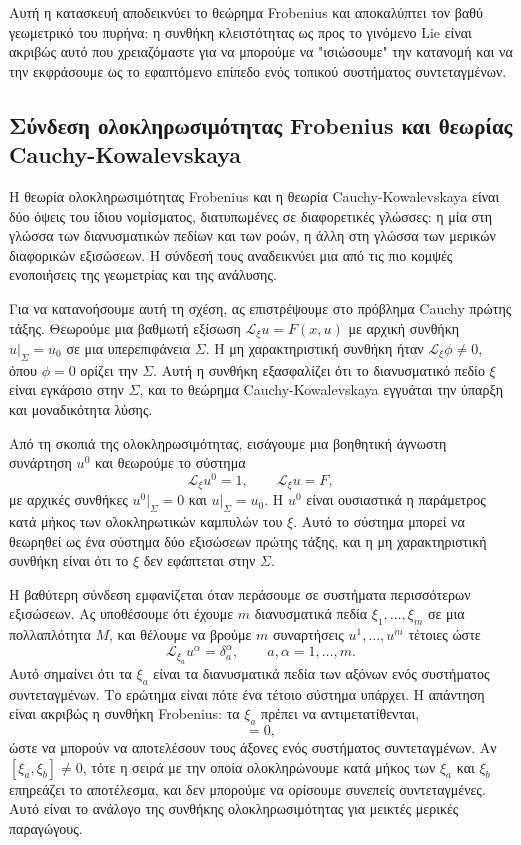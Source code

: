 \documentclass[12pt]{article}
\begin{document}
Αυτή η κατασκευή αποδεικνύει το θεώρημα Frobenius και αποκαλύπτει τον βαθύ γεωμετρικό του πυρήνα: η συνθήκη κλειστότητας ως προς το γινόμενο Lie είναι ακριβώς αυτό που χρειαζόμαστε για να μπορούμε να "ισιώσουμε" την κατανομή και να την εκφράσουμε ως το εφαπτόμενο επίπεδο ενός τοπικού συστήματος συντεταγμένων.

\subsection{Σύνδεση ολοκληρωσιμότητας Frobenius και θεωρίας Cauchy-Kowalevskaya}

Η θεωρία ολοκληρωσιμότητας Frobenius και η θεωρία Cauchy-Kowalevskaya είναι δύο όψεις του ίδιου νομίσματος, διατυπωμένες σε διαφορετικές γλώσσες: η μία στη γλώσσα των διανυσματικών πεδίων και των ροών, η άλλη στη γλώσσα των μερικών διαφορικών εξισώσεων. Η σύνδεσή τους αναδεικνύει μια από τις πιο κομψές ενοποιήσεις της γεωμετρίας και της ανάλυσης.

Για να κατανοήσουμε αυτή τη σχέση, ας επιστρέψουμε στο πρόβλημα Cauchy πρώτης τάξης. Θεωρούμε μια βαθμωτή εξίσωση $\mathcal{L}_\xi u = F(x, u)$ με αρχική συνθήκη $u|_{\Sigma} = u_0$ σε μια υπερεπιφάνεια $\Sigma$. Η μη χαρακτηριστική συνθήκη ήταν $\mathcal{L}_\xi \phi \neq 0$, όπου $\phi = 0$ ορίζει την $\Sigma$. Αυτή η συνθήκη εξασφαλίζει ότι το διανυσματικό πεδίο $\xi$ είναι εγκάρσιο στην $\Sigma$, και το θεώρημα Cauchy-Kowalevskaya εγγυάται την ύπαρξη και μοναδικότητα λύσης.

Από τη σκοπιά της ολοκληρωσιμότητας, εισάγουμε μια βοηθητική άγνωστη συνάρτηση $u^0$ και θεωρούμε το σύστημα
\[
\mathcal{L}_\xi u^0 = 1, \qquad \mathcal{L}_\xi u = F,
\]
με αρχικές συνθήκες $u^0|_{\Sigma} = 0$ και $u|_{\Sigma} = u_0$. Η $u^0$ είναι ουσιαστικά η παράμετρος κατά μήκος των ολοκληρωτικών καμπυλών του $\xi$. Αυτό το σύστημα μπορεί να θεωρηθεί ως ένα σύστημα δύο εξισώσεων πρώτης τάξης, και η μη χαρακτηριστική συνθήκη είναι ότι το $\xi$ δεν εφάπτεται στην $\Sigma$.

Η βαθύτερη σύνδεση εμφανίζεται όταν περάσουμε σε συστήματα περισσότερων εξισώσεων. Ας υποθέσουμε ότι έχουμε $m$ διανυσματικά πεδία $\xi_1, \dots, \xi_m$ σε μια πολλαπλότητα $M$, και θέλουμε να βρούμε $m$ συναρτήσεις $u^1, \dots, u^m$ τέτοιες ώστε
\begin{equation}
\mathcal{L}_{\xi_a} u^\alpha = \delta_a^\alpha, \qquad a, \alpha = 1, \dots, m.
\end{equation}
Αυτό σημαίνει ότι τα $\xi_a$ είναι τα διανυσματικά πεδία των αξόνων ενός συστήματος συντεταγμένων. Το ερώτημα είναι πότε ένα τέτοιο σύστημα υπάρχει. Η απάντηση είναι ακριβώς η συνθήκη Frobenius: τα $\xi_a$ πρέπει να αντιμετατίθενται,
\begin{equation}
[\xi_a, \xi_b] = 0,
\end{equation}
ώστε να μπορούν να αποτελέσουν τους άξονες ενός συστήματος συντεταγμένων. Αν $[\xi_a, \xi_b] \neq 0$, τότε η σειρά με την οποία ολοκληρώνουμε κατά μήκος των $\xi_a$ και $\xi_b$ επηρεάζει το αποτέλεσμα, και δεν μπορούμε να ορίσουμε συνεπείς συντεταγμένες. Αυτό είναι το ανάλογο της συνθήκης ολοκληρωσιμότητας για μεικτές μερικές παραγώγους.
\end{document}
